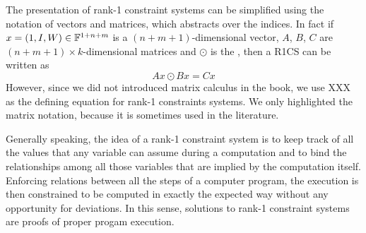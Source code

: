 \begin{remark} The presentation of rank-1 constraint systems can be simplified using the notation of vectors and matrices, which abstracts over the indices. In fact if
$x= (1,I,W)\in \mathbb{F}^{1+n+m}$ is a $(n+m+1)$-dimensional vector, $A$, $B$, $C$ are $(n+m+1)\times k$-dimensional matrices and $\odot$ is the , then a R1CS can be written as
$$
Ax \odot Bx = Cx
$$
However,  since we did not introduced matrix calculus in the book, we use XXX as the defining equation for rank-1 constraints systems. We only highlighted the matrix notation, because it is sometimes used in the literature.
\end{remark}
Generally speaking, the idea of a rank-1 constraint system is to keep track of all the values that any variable can assume during a computation and to bind the relationships among all those variables that are implied by the computation itself. Enforcing relations between all the steps of a computer program, the execution is then constrained to be computed in exactly the expected way without any opportunity for deviations. In this sense, solutions to rank-1 constraint systems are proofs of proper progam execution.

